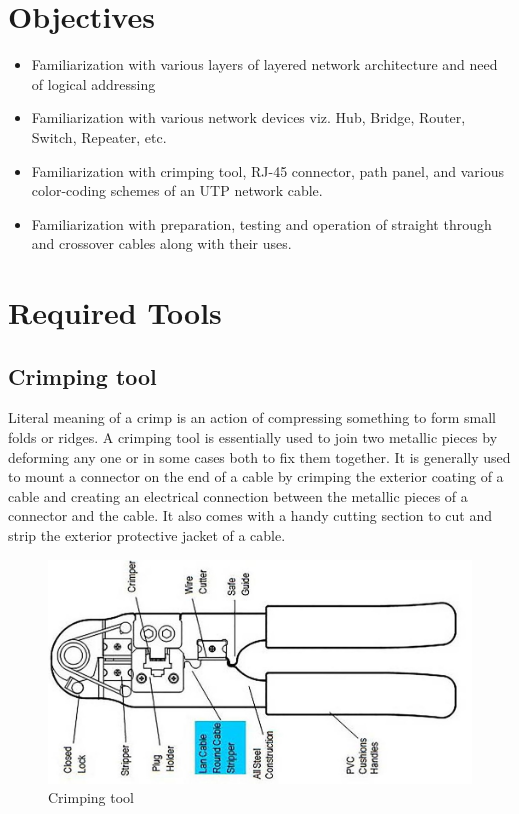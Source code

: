 \documentclass{lab_sheet}
\begin{document}
\tableofcontents
\pagebreak
\listoftables
\pagebreak
\listoffigures
\pagebreak
{}
\section{Objectives}
\begin{itemize}
    \item Familiarization with various layers of layered network architecture and need of logical addressing
    \item Familiarization with various network devices viz. Hub, Bridge, Router, Switch, Repeater, etc.
    \item Familiarization with crimping tool, RJ-45 connector, path panel, and various color-coding schemes of an UTP network cable.
    \item Familiarization with preparation, testing and operation of straight through and crossover cables along with their uses.
\end{itemize}
\section{Required Tools}
\subsection{Crimping tool}
Literal meaning of a crimp is an action of compressing something to form small folds or ridges. A crimping tool is essentially used to join two metallic pieces by deforming any one or in some cases both to fix them together. It is generally used to mount a connector on the end of a cable by crimping the exterior coating of a cable and creating an electrical connection between the metallic pieces of a connector and the cable. It also comes with a handy cutting section to cut and strip the exterior protective jacket of a cable.
\begin{figure}[H]
    \centering
    \includegraphics[scale=0.3]{Figures/climper.jpg}
    \caption{Crimping tool}
    \label{fig:crimpingtool}
\end{figure}
\end{document}
